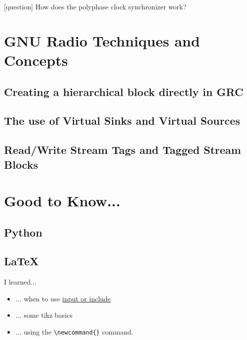 \documentclass{article}
\begin{document}
\bigskip

\color{blue}
[question] How does the polyphase clock synchronizer work?
\color{black}

\section{GNU Radio Techniques and Concepts}

\subsection{Creating a hierarchical block directly in GRC}

\subsection{The use of Virtual Sinks and Virtual Sources}

\subsection{Read/Write Stream Tags and Tagged Stream Blocks}

\section{Good to Know...}

\subsection{Python}

\subsection{\LaTeX}

I learned...

\begin{itemize}
	\item ... when to use \href{https://tex.stackexchange.com/questions/246/when-should-i-use-input-vs-include}{input or include}
	\item ... some tikz basics
	\item ... using the \verb|\newcommand{}| command.
\end{itemize}
\end{document}
